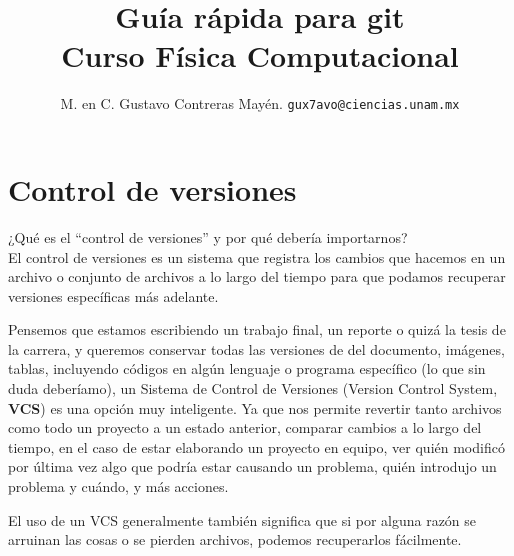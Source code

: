 
\hypersetup{
    colorlinks=true,
    linkcolor=blue,
    filecolor=magenta,      
    urlcolor=red,
    }
\usepackage{minted}
\usepackage{menukeys}

\title{\vspace{-2cm}Guía rápida para git \\ {\large Curso Física Computacional} \vspace{-3ex}}
\author{M. en C. Gustavo Contreras Mayén. \texttt{gux7avo@ciencias.unam.mx}}
\date{}



\fontsize{14}{14}\selectfont
\vspace{-4cm}
\maketitle

\section{Control de versiones}

¿Qué es el \enquote{control de versiones} y por qué debería importarnos?
\\
El control de versiones es un sistema que registra los cambios que hacemos en un archivo o conjunto de archivos a lo largo del tiempo para que podamos recuperar versiones específicas más adelante.
\par
Pensemos que estamos escribiendo un trabajo final, un reporte o quizá la tesis de la carrera, y queremos conservar todas las versiones de del documento, imágenes, tablas, incluyendo códigos en algún lenguaje o programa específico (lo que sin duda deberíamo), un Sistema de Control de Versiones (Version Control System, \textbf{VCS}) es una opción muy inteligente. Ya que nos permite revertir tanto archivos como todo un proyecto a un estado anterior, comparar cambios a lo largo del tiempo, en el caso de estar elaborando un proyecto en equipo, ver quién modificó por última vez algo que podría estar causando un problema, quién introdujo un problema y cuándo, y más acciones.
\par
El uso de un VCS generalmente también significa que si por alguna razón se arruinan las cosas o se pierden archivos, podemos recuperarlos fácilmente. 

